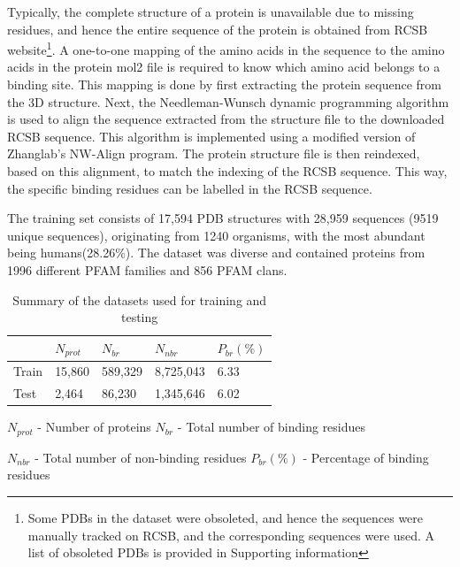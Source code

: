 \documentclass[journal=jacsat,manuscript=article]{achemso}
\begin{document}
Typically, the complete structure of a protein is unavailable due to missing residues, and hence the entire sequence of the protein is obtained from RCSB \cite{burley2021rcsb} website\footnote{Some PDBs in the dataset were obsoleted, and hence the sequences were manually tracked on RCSB, and the corresponding sequences were used. A list of obsoleted PDBs is provided in Supporting information}. A one-to-one mapping of the amino acids in the sequence to the amino acids in the protein mol2 file is required to know which amino acid belongs to a binding site. This mapping is done by first extracting the protein sequence from the 3D structure. Next, the Needleman-Wunsch dynamic programming algorithm is used to align the sequence extracted from the structure file to the downloaded RCSB sequence. This algorithm is implemented using a modified version of Zhanglab's NW-Align program\cite{NWAlign}. The protein structure file is then reindexed, based on this alignment, to match the indexing of the RCSB sequence. This way, the specific binding residues can be labelled in the RCSB sequence.


The training set consists of 17,594 PDB structures with 28,959 sequences (9519 unique sequences), originating from 1240 organisms, with the most abundant being humans(28.26\%). The dataset was diverse and contained proteins from 1996 different PFAM families and 856 PFAM clans.

\begin{table}
    \centering
    \begin{tabular}{| P{2.75cm} | P{2.75cm} | P{2.75cm} | P{2.75cm} | P{2.75cm} |}
        \hline
              & $N_{prot}$ & $N_{br}$ & $N_{nbr}$ & $P_{br}(\%)$ \\
        \hline
        Train & 15,860     & 589,329  & 8,725,043 & 6.33         \\
        Test  & 2,464      & 86,230   & 1,345,646 & 6.02         \\
        \hline
    \end{tabular}
    \caption{\label{tab:dataset_summary} Summary of the datasets used for training and testing}
    \vspace{5 mm}
    \noindent $N_{prot}$ - Number of proteins \hfill $N_{br}$ - Total number of binding residues

    \vspace{3 mm}

    \noindent $N_{nbr}$ - Total number of non-binding residues \hfill $P_{br}(\%)$ - Percentage of binding residues
\end{table}
\end{document}
